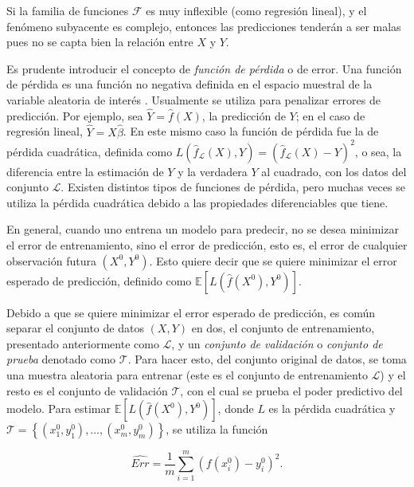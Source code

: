 Si la familia de funciones $\mathcal{F}$ es muy inflexible (como regresión lineal), y el fenómeno subyacente es complejo, entonces las predicciones tenderán a ser malas pues no se capta bien la relación entre $X$ y $Y$. %

Es prudente introducir el concepto de \textit{función de pérdida} o de error. Una función de pérdida es una función no negativa definida en el espacio muestral de la variable aleatoria de interés \cite{EncyMath_loss_func}. Usualmente se utiliza para penalizar errores de predicción. Por ejemplo, sea $\hat{Y} = \hat{f}(X)$, la predicción de $Y$; en el caso de regresión lineal, $\hat{Y} = X\hat{\beta}$. En este mismo caso la función de pérdida fue la de pérdida cuadrática, definida como 
$L(\hat{f}_{\mathcal{L}}(X), Y) = (\hat{f}_{\mathcal{L}}(X) - Y ) ^2$, o sea, la diferencia entre la estimación de $Y$ y la verdadera $Y$ al cuadrado, con los datos del conjunto $\mathcal{L}$. Existen distintos tipos de funciones de pérdida, pero muchas veces se utiliza la pérdida cuadrática debido a las propiedades diferenciables que tiene.

En general, cuando uno entrena un modelo para predecir, no se desea minimizar el error de entrenamiento, sino el error de predicción, esto es, el error de cualquier observación futura $(X^0, Y^0)$. Esto quiere decir que se quiere minimizar el error esperado de predicción, definido como $\mathbb{E} \left[ L(\hat{f}(X^0), Y^0 ) \right]$.

Debido a que se quiere minimizar el error esperado de predicción, es común separar el conjunto de datos $(X, Y)$ en dos, el conjunto de entrenamiento, presentado anteriormente como $\mathcal{L}$, y un \textit{conjunto de validación} o \textit{conjunto de prueba} denotado como $\mathcal{T}$. Para hacer esto, del conjunto original de datos, se toma una muestra aleatoria para entrenar (este es el conjunto de entrenamiento $\mathcal{L}$) y el resto es el conjunto de validación $\mathcal{T}$, con el cual se prueba el poder predictivo del modelo. Para estimar $\mathbb{E} \left[ L(\hat{f}(X^0), Y^0 ) \right]$, donde $L$ es la pérdida cuadrática y $\mathcal{T} = \left\{ (x_1^0, y_1^0), \hdots, (x_m^0, y_m^0) \right\}$, se utiliza la función

\[
  \hat{Err} = \frac{1}{m} \sum_{i = 1}^m \left( f(x_i^0) - y_i^0 \right)^2.
\]

